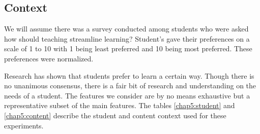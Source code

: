 \subsection{Context \label{chap5:context}}

We will assume there was a survey conducted among students who were asked how should teaching streamline learning? Student's gave their preferences on a scale of 1 to 10 with 1 being least preferred and 10 being most preferred. These preferences were normalized. \par

Research has shown that students prefer to learn a certain way. Though there is no unanimous consensus, there is a fair bit of research and understanding on the needs of a student. The features we consider are by no means exhaustive but a representative subset of the main features. The tables \ref{chap5:student} and \ref{chap5:content} describe the student and content context used for these experiments.\par


